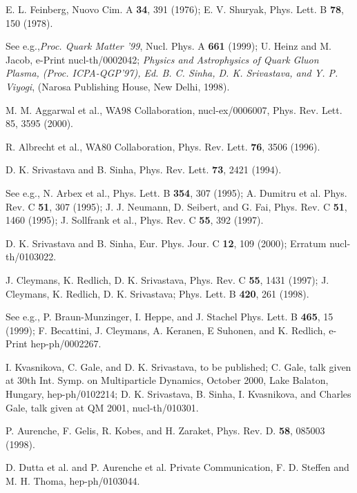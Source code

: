 \begin{references}

 E. L. Feinberg, Nuovo Cim. A {\bf 34}, 391 (1976);
                E. V. Shuryak, Phys. Lett. B {\bf 78}, 150 (1978).

 See e.g.,{\sl Proc. Quark Matter '99},
         Nucl. Phys. A {\bf 661} (1999);
U. Heinz and M. Jacob, e-Print nucl-th/0002042;
 {\sl Physics and Astrophysics of Quark Gluon Plasma, (Proc. ICPA-QGP'97),
 Ed. B. C. Sinha, D. K. Srivastava, and Y. P. Viyogi}, (Narosa Publishing
 House, New Delhi, 1998).

 M. M. Aggarwal et al., WA98 Collaboration,
 nucl-ex/0006007, Phys. Rev. Lett. 85, 3595 (2000).

 R. Albrecht et al., WA80 Collaboration, Phys. Rev. Lett.
{\bf 76}, 3506 (1996).

D. K. Srivastava and B. Sinha, Phys. Rev. Lett. {\bf 73}, 2421 (1994). 

 See e.g.,
 N. Arbex et al., Phys. Lett. B {\bf 354}, 307 (1995);
A. Dumitru et al.  Phys. Rev. C {\bf 51}, 307 (1995); 
J. J. Neumann, D. Seibert, and G. Fai, Phys. Rev. C {\bf 51}, 1460 (1995);
J. Sollfrank et al., Phys. Rev. C {\bf 55}, 392 (1997).

 D. K. Srivastava and B. Sinha, 
Eur. Phys. Jour. C {\bf 12}, 109 (2000); Erratum  nucl-th/0103022.

J. Cleymans, K. Redlich, D. K. Srivastava,  
Phys. Rev. C {\bf 55}, 1431 (1997);
J. Cleymans, K. Redlich, D. K. Srivastava;
Phys. Lett. B {\bf 420}, 261 (1998). 

  See e.g., P. Braun-Munzinger, I. Heppe,  and J. Stachel 
 Phys. Lett. B {\bf 465}, 15 (1999);
 F. Becattini, J. Cleymans, A. Keranen, E Suhonen, and
 K. Redlich, e-Print hep-ph/0002267. 

 I. Kvasnikova, C. Gale, and D. K. Srivastava,
to be published; C. Gale, talk given at 30th Int. Symp. on Multiparticle
Dynamics, October 2000, Lake Balaton, Hungary, hep-ph/0102214;
 D. K. Srivastava, B. Sinha, I. Kvasnikova, and Charles Gale,
talk given at QM 2001, nucl-th/010301.

 P. Aurenche, F. Gelis, R. Kobes, and H. Zaraket,
Phys. Rev. D. {\bf 58}, 085003 (1998).

 D. Dutta et al. and P. Aurenche et al. Private Communication,
F. D. Steffen and M. H. Thoma, hep-ph/0103044.



\end{references}
